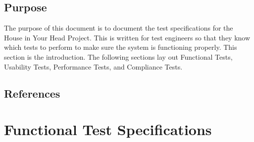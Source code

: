 \documentclass{article}
\begin{document}
\subsection{Purpose}

The purpose of this document is to document the test specifications for the House in Your Head Project. This is written for test engineers so that they know which tests to perform to make sure the system is functioning properly. This section is the introduction. The following sections lay out Functional Tests, Usability Tests, Performance Tests, and Compliance Tests.

\subsection{References}



\newpage

\section{Functional Test Specifications}

\end{document}
